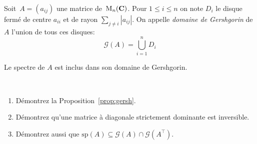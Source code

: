 \begin{definition}
	Soit~$A=(a_{ij})$ une matrice de~$\mathrm{M}_n(\mathbf{C})$.
Pour $1\leq i\leq n$ on note $D_i$ le disque fermé de centre $a_{ii}$ et de
rayon $\sum_{j\neq i} |a_{ij}|$. On appelle \emph{domaine de Gershgorin} de
$A$ l'union de tous ces disques:
\[
\mathcal G(A) = \bigcup_{i=1}^n D_i
\]
\end{definition}
\begin{proposition}
	\label{prop:gersh}
	Le spectre de $A$ est inclus dans son domaine de Gershgorin.
\end{proposition}

\begin{exercice}$ $
\begin{enumerate}
\item Démontrez la Proposition~\ref{prop:gersh}.
\item Démontrez qu'une matrice à diagonale strictement dominante est inversible.
\item Démontrez aussi que $\mathrm{sp}(A) \subseteq \mathcal G(A) \cap \mathcal
		G(A^\top)$.
\end{enumerate}
\end{exercice}

